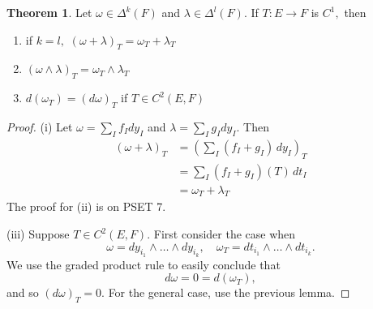 \documentclass[10pt, oneside]{article}
\theoremstyle{definition}
\newtheorem{thm}{Theorem}
\begin{document}
\begin{thm}
    Let $\omega\in \Delta^k(F)$ and $\lambda\in \Delta^l(F).$ If $T: E\to F$ is $C^1,$ then 
    \begin{enumerate}
        \item if $k = l,$ $(\omega + \lambda)_T = \omega_T + \lambda_T$
        \item $(\omega\wedge\lambda)_T = \omega_T\wedge\lambda_T$
        \item $d(\omega_T) = (d\omega)_T$ if $T\in C^2(E,F)$
    \end{enumerate}
    \begin{proof}
        (i) Let $\omega = \sum_I f_I dy_I$ and $\lambda = \sum_I g_I dy_I.$ Then 
        \begin{align*}
            (\omega + \lambda)_T &= \left(\sum_I (f_I + g_I)\,dy_I\right)_T\\
            &= \sum_I (f_I + g_I)(T)\, dt_I\\
            &= \omega_T + \lambda_T
        \end{align*}
        The proof for (ii) is on PSET 7.

        (iii) Suppose $T\in C^2(E,F).$ First consider the case when 
        \[\omega = dy_{i_1} \wedge \dots \wedge dy_{i_k}, \quad \omega_T = dt_{i_1} \wedge \dots \wedge dt_{i_k}.\] We use the graded product rule to easily conclude that 
        \[d\omega =0 = d(\omega_T),\] and so $(d\omega)_T = 0.$ For the general case, use the previous lemma.
    \end{proof}
\end{thm}


\newpage
\end{document}
